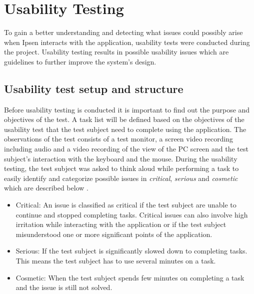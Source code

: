 %

\section{Usability Testing} \label{sec:usabilitytesting}

To gain a better understanding and detecting what issues could possibly arise when Ipsen interacts with the application, usability tests were conducted during the project.
Usability testing results in possible usability issues which are guidelines to further improve the system's design.

\subsection{Usability test setup and structure}
Before usability testing is conducted it is important to find out the purpose and objectives of the test.
A task list will be defined based on the objectives of the usability test that the test subject need to complete using the application.
The observations of the test consists of a test monitor, a screen video recording including audio and a video recording of the view of the PC screen and the test subject's interaction with the keyboard and the mouse.
During the usability testing, the test subject was asked to think aloud while performing a task to easily identify and categorize possible issues in \textit{critical}, \textit{serious} and \textit{cosmetic} which are described below \citep[p.~154]{brugervenligtwebdesign}.

\begin{itemize}
  	\item 
  	Critical: An issue is classified as critical if the test subject are unable to continue and stopped completing tasks.
	Critical issues can also involve high irritation while interacting with the application or if the test subject misunderstood one or more significant points of the application.
  	\item 
  	Serious: If the test subject is significantly slowed down to completing tasks.
	This means the test subject has to use several minutes on a task.
	\item 
	Cosmetic: When the test subject spends few minutes on completing a task and the issue is still not solved. %
\end{itemize}

